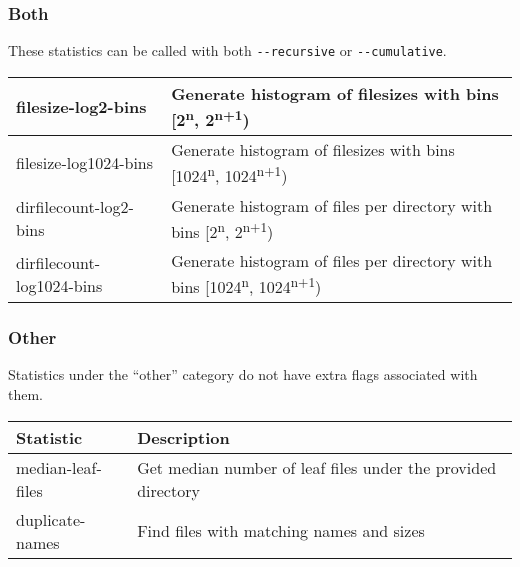\subsubsection{Both}
These statistics can be called with both \texttt{-{}-recursive} or
\texttt{-{}-cumulative}.
\\
\begin{table}[h!]
  \begin{tabular} {| l | l |}
    \hline
    filesize-log2-bins & Generate histogram of filesizes with bins
    [2\textsuperscript{n}, 2\textsuperscript{n+1}) \\
    \hline
    filesize-log1024-bins & Generate histogram of filesizes with bins
    [1024\textsuperscript{n}, 1024\textsuperscript{n+1}) \\
    \hline
    dirfilecount-log2-bins & Generate histogram of files per directory with bins
    [2\textsuperscript{n}, 2\textsuperscript{n+1}) \\
    \hline
    dirfilecount-log1024-bins & Generate histogram of files per directory with bins
    [1024\textsuperscript{n}, 1024\textsuperscript{n+1}) \\
    \hline
  \end{tabular}
\end{table}

\subsubsection{Other}
Statistics under the ``other'' category do not have extra flags
associated with them.
\\
\begin{table}[h!]
  \begin{tabular} {| l | l |}
    \hline
    Statistic & Description \\
    \hline
    median-leaf-files & Get median number of leaf files under the provided
    directory \\
    \hline
    duplicate-names & Find files with matching names and sizes \\
    \hline
  \end{tabular}
\end{table}
